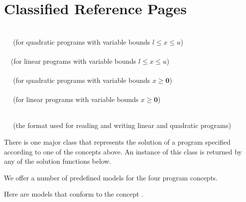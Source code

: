 \label{chapter:QPsolver}

\section{Classified Reference Pages}

\\
$\quad$ (for quadratic programs with variable bounds $l\leq x \leq u$) \\
 \\
$\quad$(for linear programs with variable bounds $l\leq x \leq u$)\\
\\
$\quad$ (for quadratic programs with variable bounds $x\geq\mathbf{0}$) \\
\\
$\quad$ (for linear programs with variable bounds $x\geq\mathbf{0}$)

\\
$\quad$ (the format used for reading and writing linear and quadratic 
programs)


There is one major class that represents the solution of a program
specified according to one of the concepts above. An instance of this 
class is returned by any of the solution functions below.


We offer a number of predefined models for the four program concepts.

Here are models that conform to the concept . 

